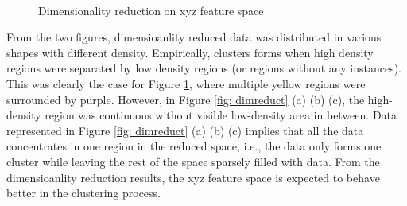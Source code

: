 \documentclass[a4paper]{article}
\begin{document}
\begin{figure}[H]
    \centering
     \\
    \caption{Dimensionality reduction on xyz feature space}
    \label{fig: dimreduct_xyz}
\end{figure}

From the two figures, dimensioanlity reduced data was distributed in various shapes with different density. Empirically, clusters forms when high density regions were separated by low density regions (or regions without any instances). This was clearly the case for Figure \ref{fig: dimreduct_xyz}, where multiple yellow regions were surrounded by purple. However, in Figure \ref{fig: dimreduct} (a) (b) (c), the high-density region was continuous without visible low-density area in between. Data represented in Figure \ref{fig: dimreduct} (a) (b) (c) implies that all the data concentrates in one region in the reduced space, i.e., the data only forms one cluster while leaving the rest of the space sparsely filled with data. From the dimensioanlity reduction results, the xyz feature space is expected to behave better in the clustering process.
\end{document}
